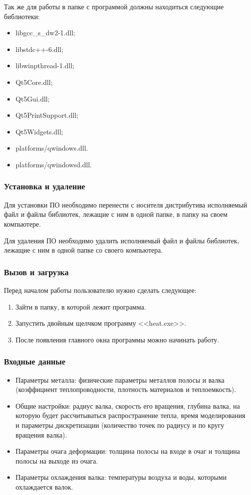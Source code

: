 Так же для работы в папке с программой должны находиться следующие библиотеки:
\begin{itemize}
\item libgcc\_s\_dw2-1.dll;
\item libstdc++-6.dll;
\item libwinpthread-1.dll;
\item Qt5Core.dll;
\item Qt5Gui.dll;
\item Qt5PrintSupport.dll;
\item Qt5Widgets.dll;
\item platforms/qwindows.dll.
\item platforms/qwindowsd.dll.
\end{itemize}

\subsubsection{Установка и удаление}
Для установки ПО необходимо перенести с носителя дистрибутива исполняемый файл и файлы библиотек, лежащие с ним в одной папке, в папку на своем компьютере.

Для удаления ПО необходимо удалить исполняемый файл и файлы библиотек, лежащие с ним в одной папке со своего компьютера.

\subsubsection{Вызов и загрузка}
Перед началом работы пользователю нужно сделать следующее:
\begin{enumerate}
\item Зайти в папку, в которой лежит программа.
\item Запустить двойным щелчком программу <<heat.exe>>.
\item После появления главного окна программы можно начинать работу.

\end{enumerate}

\subsubsection{Входные данные}
\begin{itemize}
\item Параметры металла: физические параметры металлов полосы и валка (коэффициент теплопроводности, плотность материалов и теплоемкость).
\item Общие настройки: радиус валка, скорость его вращения, глубина валка, на которую будет рассчитываться распространение тепла, время моделирования и параметры дискретизации (количество точек по радиусу и по кругу вращения валка).
\item Параметры очага деформации: толщина полосы на входе в очаг и толщина полосы на выходе из очага.
\item Параметры охлаждения валка: температуры воздуха и воды, которыми охлаждается валок.
\end{itemize}


